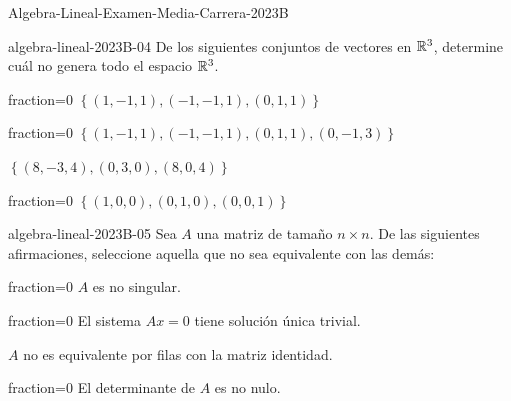 \documentclass[10pt]{article}
\begin{document}
\begin{quiz}{Algebra-Lineal-Examen-Media-Carrera-2023B}

\begin{multi}{algebra-lineal-2023B-04}
De los siguientes conjuntos de vectores en $\mathbb{R}^3$, determine cu\'al no genera todo el espacio $\mathbb{R}^3$.
    \item[fraction=0]  $\left\lbrace(1,-1,1),(-1,-1,1),(0,1,1)\right\rbrace$
    \item[fraction=0]  $\left\lbrace (1,-1,1),(-1,-1,1),(0,1,1),(0,-1,3) \right\rbrace$
    \item*  $\left\lbrace(8,-3,4),(0,3,0),(8,0,4)\right\rbrace$
    \item[fraction=0] $\left\lbrace (1,0,0),(0,1,0),(0,0,1) \right\rbrace$
\end{multi}


\begin{multi}{algebra-lineal-2023B-05}
Sea $A$ una matriz de tama\~no $n\times n$. De las siguientes afirmaciones, seleccione aquella que no sea equivalente con las dem\'as:
    \item[fraction=0] $A$ es no singular.
    \item[fraction=0] El sistema $Ax=0$ tiene soluci\'on \'unica trivial.
    \item* $A$ no es equivalente por filas con la matriz identidad. 
    \item[fraction=0] El determinante de $A$ es no nulo.
\end{multi} 
\end{quiz}
\end{document}
